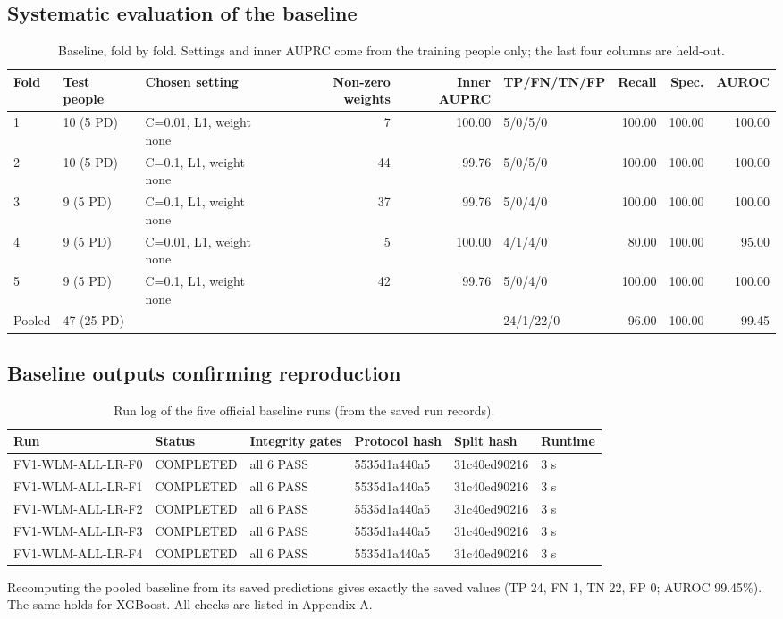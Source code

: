 \documentclass[11pt,a4paper]{article}
\begin{document}
\subsection{Systematic evaluation of the baseline}\label{sec:baselineeval}
\begin{table}[H]\centering\scriptsize\renewcommand{\arraystretch}{1.15}
\caption{Baseline, fold by fold. Settings and inner AUPRC come from the training people only; the last four columns are held-out.}
\begin{tabular}{llp{3.1cm}rrlrrr}
\toprule
\textbf{Fold} & \textbf{Test people} & \textbf{Chosen setting} & \textbf{Non-zero weights} & \textbf{Inner AUPRC} & \textbf{TP/FN/TN/FP} & \textbf{Recall} & \textbf{Spec.} & \textbf{AUROC}\\
\midrule
1 & 10 (5 PD) & C=0.01, L1, weight none & 7 & 100.00 & 5/0/5/0 & 100.00 & 100.00 & 100.00\\
2 & 10 (5 PD) & C=0.1, L1, weight none & 44 & 99.76 & 5/0/5/0 & 100.00 & 100.00 & 100.00\\
3 & 9 (5 PD) & C=0.1, L1, weight none & 37 & 99.76 & 5/0/4/0 & 100.00 & 100.00 & 100.00\\
4 & 9 (5 PD) & C=0.01, L1, weight none & 5 & 100.00 & 4/1/4/0 & 80.00 & 100.00 & 95.00\\
5 & 9 (5 PD) & C=0.1, L1, weight none & 42 & 99.76 & 5/0/4/0 & 100.00 & 100.00 & 100.00\\
Pooled & 47 (25 PD) &  &  &  & 24/1/22/0 & 96.00 & 100.00 & 99.45\\
\bottomrule
\end{tabular}\end{table}
\subsection{Baseline outputs confirming reproduction}\label{sec:reproduction}
\begin{table}[H]\centering\footnotesize\renewcommand{\arraystretch}{1.15}
\caption{Run log of the five official baseline runs (from the saved run records).}
\begin{tabular}{llllll}
\toprule
\textbf{Run} & \textbf{Status} & \textbf{Integrity gates} & \textbf{Protocol hash} & \textbf{Split hash} & \textbf{Runtime}\\
\midrule
FV1-WLM-ALL-LR-F0 & COMPLETED & all 6 PASS & 5535d1a440a5 & 31c40ed90216 & 3 s\\
FV1-WLM-ALL-LR-F1 & COMPLETED & all 6 PASS & 5535d1a440a5 & 31c40ed90216 & 3 s\\
FV1-WLM-ALL-LR-F2 & COMPLETED & all 6 PASS & 5535d1a440a5 & 31c40ed90216 & 3 s\\
FV1-WLM-ALL-LR-F3 & COMPLETED & all 6 PASS & 5535d1a440a5 & 31c40ed90216 & 3 s\\
FV1-WLM-ALL-LR-F4 & COMPLETED & all 6 PASS & 5535d1a440a5 & 31c40ed90216 & 3 s\\
\bottomrule
\end{tabular}\end{table}
Recomputing the pooled baseline from its saved predictions gives exactly the saved values (TP 24, FN 1, TN 22, FP 0; AUROC 99.45\%). The same holds for XGBoost. All checks are listed in Appendix A.
\end{document}
